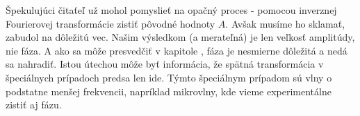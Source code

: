 \begin{poznamka}
     Špekulujúci čitaťeľ už mohol pomyslieť na opačný proces - pomocou
     inverznej Fourierovej transformácie zistiť pôvodné hodnoty $A$.
     Avšak musíme ho sklamať, zabudol na dôležitú vec. Našim výsledkom
     (a merateľná) je len veľkosť amplitúdy, nie fáza. A ako sa môže
     presvedčiť v kapitole , fáza je nesmierne
     dôležitá a nedá sa nahradiť. Istou útechou môže byť informácia,
     že spätná transformácia v špeciálnych prípadoch predsa len ide.
     Týmto špeciálnym prípadom sú vlny o podstatne menšej frekvencii,
     napríklad mikrovlny, kde vieme experimentálne zistiť aj fázu.
\end{poznamka}

